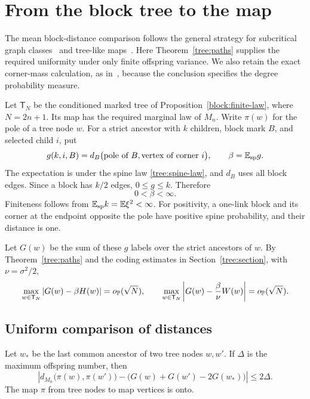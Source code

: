 \section{From the block tree to the map}\label{metric:section}

The mean block-distance comparison follows the general strategy for
subcritical graph classes~\cite[Section~5]{PanagiotouStuflerWeller2016}
and tree-like maps~\cite[preprint Section~6.8]{Stufler2020}.
Here Theorem~\ref{tree:paths} supplies the required uniformity under
only finite offspring variance. We also retain the exact corner-mass
calculation, as in~\cite[Section~9]{Stufler2026}, because the conclusion
specifies the degree probability measure.

Let $\mathsf T_N$ be the conditioned marked tree of
Proposition~\ref{block:finite-law}, where $N=2n+1$. Its map has the
required marginal law of $M_n$. Write $\pi(w)$ for the pole of a tree
node $w$. For a strict ancestor with $k$ children, block mark $B$, and
selected child $i$, put
\[
 g(k,i,B)=d_B\big(\text{pole of }B,\text{vertex of corner }i\big),
 \qquad \beta=\mathbb E_{\rm sp}g.
\]
The expectation is under the spine law \eqref{tree:spine-law}, and
$d_B$ uses all block edges. Since a block has $k/2$ edges,
$0\le g\le k$. Therefore
\begin{equation}\label{metric:beta}
 0<\beta<\infty.
\end{equation}
Finiteness follows from $\mathbb E_{\rm sp}k=\mathbb E\xi^2<\infty$.
For positivity, a one-link block and its corner at the endpoint
opposite the pole have positive spine probability, and their distance
is one.

Let $G(w)$ be the sum of these $g$ labels over the strict ancestors of
$w$. By Theorem~\ref{tree:paths} and the coding estimates in
Section~\ref{tree:section}, with $\nu=\sigma^2/2$,
\begin{equation}\label{metric:uniform-poles}
 \max_{w\in\mathsf T_N}
 \left|G(w)-\beta H(w)\right|=o_{\mathbb P}(\sqrt N),\qquad
 \max_{w\in\mathsf T_N}
 \left|G(w)-\frac{\beta}{\nu}W(w)\right|=o_{\mathbb P}(\sqrt N).
\end{equation}

\subsection{Uniform comparison of distances}

\begin{lemma}\label{metric:poles}
Let $w_*$ be the last common ancestor of two tree nodes $w,w'$.
If $\Delta$ is the maximum offspring number, then
\[
 \left|d_{M_n}\big(\pi(w),\pi(w')\big)
       -\big(G(w)+G(w')-2G(w_*)\big)\right|\le2\Delta.
\]
The map $\pi$ from tree nodes to map vertices is onto.
\end{lemma}

